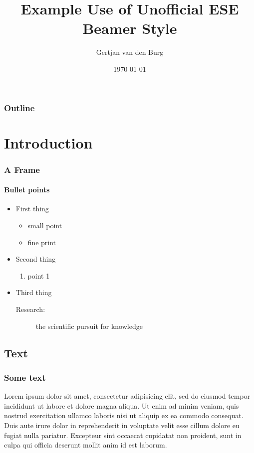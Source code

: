 \documentclass[t]{beamer}
\title{Example Use of Unofficial ESE Beamer Style}
\author{Gertjan van den Burg}
\date{\today}
\institute{Econometric Institute}
\begin{document}
\begin{frame}[plain]
	\titlepage
\end{frame}

\begin{frame}[t]
	\frametitle{Outline}
	\tableofcontents
\end{frame}


\section{Introduction}
\begin{frame}
	\frametitle{A Frame}
	\framesubtitle{Bullet points}
	\begin{itemize}
		\item First thing
		\begin{itemize}
			\item small point
			\item fine print
		\end{itemize}
		\item Second thing
		\begin{enumerate}
			\item point 1
		\end{enumerate}
		\item Third thing
		\begin{description}
			\item[Research:] the scientific pursuit for knowledge
		\end{description}
	\end{itemize}
\end{frame}

\subsection{Text}
\begin{frame}
	\frametitle{Some text}
	Lorem ipsum dolor sit amet, consectetur adipisicing elit, sed do eiusmod tempor incididunt ut labore et dolore magna aliqua. Ut enim ad minim veniam, quis nostrud exercitation ullamco laboris nisi ut aliquip ex ea commodo consequat. Duis aute irure dolor in reprehenderit in voluptate velit esse cillum dolore eu fugiat nulla pariatur. Excepteur sint occaecat cupidatat non proident, sunt in culpa qui officia deserunt mollit anim id est laborum.
\end{frame}
\end{document}
